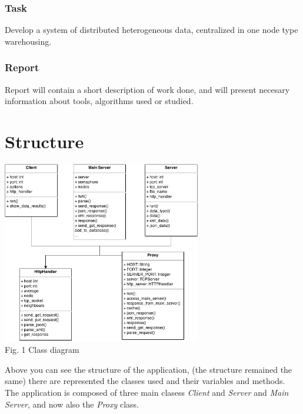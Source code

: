 \documentclass[12pt]{article}
\begin{document}
  \subsubsection{Task}

  Develop a system of distributed heterogeneous data, centralized in one node type warehousing.

  \subsubsection{Report}

  Report will contain a short description of work done, and will present necesary information
  about tools, algorithms used or studied.

  
  \section{Structure}

    \begin{minipage}[b]{1.0\linewidth}
      \begin{center}
        \includegraphics[width=0.65\textwidth]{diagram}
         \\ Fig. 1 Class diagram
      \end{center}
    \end{minipage}
    
    \vspace{0.5cm}

    Above you can see the structure of the application, (the structure remained the same) there are 
    represented the classes used  and their variables and methods.
    The application is composed of three main clasess \textit{Client}
    and \textit{Server} and \textit{Main Server}, and now also the \textit{Proxy} class. \\
\end{document}
